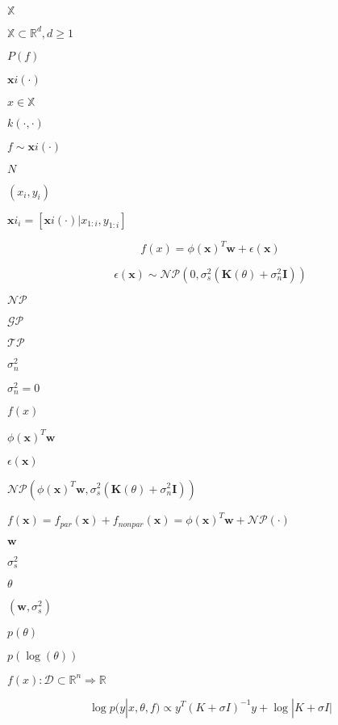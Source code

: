 \documentclass{article}
\begin{document}
$\mathbb{X}$
\pagebreak

$\mathbb{X} \subset \mathbb{R}^d, d \geq 1$
\pagebreak

$P(f)$
\pagebreak

$\mathbf{x}i(\cdot)$
\pagebreak

$x \in \mathbb{X}$
\pagebreak

$k(\cdot,\cdot)$
\pagebreak

$f \sim \mathbf{x}i(\cdot)$
\pagebreak

$N$
\pagebreak

$(x_i,y_i)$
\pagebreak

$\mathbf{x}i_i = \left[ \mathbf{x}i(\cdot) | x_{1:i},y_{1:i} \right]$
\pagebreak

\[ f(x) = \phi(\mathbf{x})^T \mathbf{w} + \epsilon(\mathbf{x}) \]
\pagebreak

\[ \epsilon(\mathbf{x}) \sim \mathcal{NP} \left( 0, \sigma^2_s (\mathbf{K}(\theta) + \sigma^2_n \mathbf{I}) \right) \]
\pagebreak

$\mathcal{NP}$
\pagebreak

$\mathcal{GP}$
\pagebreak

$\mathcal{TP}$
\pagebreak

$\sigma^2_n$
\pagebreak

$\sigma^2_n = 0$
\pagebreak

$f(x)$
\pagebreak

$\phi(\mathbf{x})^T\mathbf{w}$
\pagebreak

$\epsilon(\mathbf{x})$
\pagebreak

$\mathcal{NP} \left(\phi(\mathbf{x})^T\mathbf{w}, \sigma^2_s (\mathbf{K}(\theta) + \sigma^2_n \mathbf{I}) \right)$
\pagebreak

$f(\mathbf{x}) = f_{par}(\mathbf{x}) + f_{nonpar}(\mathbf{x}) = \phi(\mathbf{x})^T\mathbf{w} + \mathcal{NP}(\cdot)$
\pagebreak

$\mathbf{w}$
\pagebreak

$\sigma_s^2$
\pagebreak

$\theta$
\pagebreak

$(\mathbf{w},\sigma_s^2)$
\pagebreak

$p(\theta)$
\pagebreak

$p(\log(\theta))$
\pagebreak

$ f(x):\mathcal{D} \subset \mathbb{R}^n \Rightarrow \mathbb{R} $
\pagebreak

\[ \log p(y|x,\theta,f) \propto y^T (K+\sigma I)^{-1} y + \log|K+\sigma I| \]
\pagebreak
\end{document}
